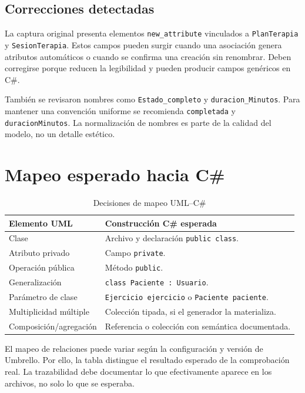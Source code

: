 \subsection{Correcciones detectadas}
La captura original presenta elementos \texttt{new\_attribute} vinculados a \texttt{PlanTerapia} y \texttt{SesionTerapia}. Estos campos pueden surgir cuando una asociación genera atributos automáticos o cuando se confirma una creación sin renombrar. Deben corregirse porque reducen la legibilidad y pueden producir campos genéricos en C\#.

También se revisaron nombres como \texttt{Estado\_completo} y \texttt{duracion\_Minutos}. Para mantener una convención uniforme se recomienda \texttt{completada} y \texttt{duracionMinutos}. La normalización de nombres es parte de la calidad del modelo, no un detalle estético.

\section{Mapeo esperado hacia C\#}
\begin{table}[H]
\centering
\caption{Decisiones de mapeo UML--C\#}
\begin{tabularx}{\textwidth}{L{4.3cm}X}
\toprule
\textbf{Elemento UML} & \textbf{Construcción C\# esperada} \\
\midrule
Clase & Archivo y declaración \texttt{public class}. \\
Atributo privado & Campo \texttt{private}. \\
Operación pública & Método \texttt{public}. \\
Generalización & \texttt{class Paciente : Usuario}. \\
Parámetro de clase & \texttt{Ejercicio ejercicio} o \texttt{Paciente paciente}. \\
Multiplicidad múltiple & Colección tipada, si el generador la materializa. \\
Composición/agregación & Referencia o colección con semántica documentada. \\
\bottomrule
\end{tabularx}
\end{table}

El mapeo de relaciones puede variar según la configuración y versión de Umbrello. Por ello, la tabla distingue el resultado esperado de la comprobación real. La trazabilidad debe documentar lo que efectivamente aparece en los archivos, no solo lo que se esperaba.

